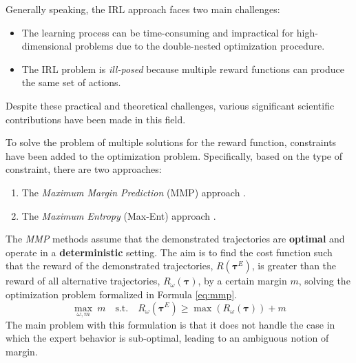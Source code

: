 

Generally speaking, the IRL approach faces two main challenges:
\begin{itemize}
    \item The learning process can be time-consuming and impractical for high-dimensional problems due to the double-nested optimization procedure.
    \item The IRL problem is \textit{ill-posed} because multiple reward functions can produce the same set of actions.
\end{itemize}

Despite these practical and theoretical challenges, various significant scientific contributions have been made in this field.

To solve the problem of multiple solutions for the reward function, constraints have been added to the optimization problem. Specifically, based on the type of constraint, there are two approaches:
\begin{enumerate}[label=\textbf{(\alph*)}]
    \item The \textit{Maximum Margin Prediction} (MMP) approach \cite{ratliff2006maximum_margin,ratliff2009learning_to_search}.
    \item The \textit{Maximum Entropy} (Max-Ent) approach \cite{ziebart2008maximum_entropy,wulfmeier2015deep_inverse_rl,finn2016guided_cost_learning}.
\end{enumerate}

The \textit{MMP} methods assume that the demonstrated trajectories are \textbf{optimal} and operate in a \textbf{deterministic} setting. The aim is to find the cost function such that the reward of the demonstrated trajectories, $R(\boldsymbol{\tau}^{E})$, is greater than the reward of all alternative trajectories, $R_{\omega}(\boldsymbol{\tau})$, by a certain margin $m$, solving the optimization problem formalized in Formula \ref{eq:mmp}.
\begin{equation}
\label{eq:mmp}
\underset{\omega, m}{\max} \ m \quad \text{s.t.} \quad R_{\omega}(\boldsymbol{\tau}^{E}) \geq \max (R_{\omega}(\boldsymbol{\tau})) + m
\end{equation}
The main problem with this formulation is that it does not handle the case in which the expert behavior is sub-optimal, leading to an ambiguous notion of margin.

